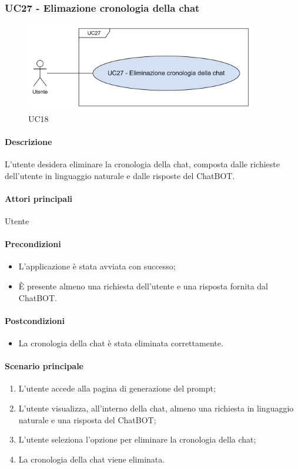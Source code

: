 \subsubsection{UC27 - Elimazione cronologia della chat}\label{UC27}

\begin{figure}[H]
  \centering
  \includegraphics[width=0.90\textwidth]{assets/uc27.png}
  \caption{UC18}
\end{figure}

\paragraph*{Descrizione}
L'utente desidera eliminare la cronologia della chat, composta dalle richieste dell'utente in linguaggio naturale e dalle risposte del ChatBOT.

\paragraph*{Attori principali}
Utente

\paragraph*{Precondizioni}
\begin{itemize}
  \item L'applicazione è stata avviata con successo;
  \item È presente almeno una richiesta dell'utente e una risposta fornita dal ChatBOT.
\end{itemize}

\paragraph*{Postcondizioni}
\begin{itemize}
  \item La cronologia della chat è stata eliminata correttamente.
\end{itemize}

\paragraph*{Scenario principale}
\begin{enumerate}
  \item L'utente accede alla pagina di generazione del prompt;
  \item L'utente visualizza, all'interno della chat, almeno una richiesta in linguaggio naturale e una risposta del ChatBOT;
  \item L'utente seleziona l'opzione per eliminare la cronologia della chat;
  \item La cronologia della chat viene eliminata.
\end{enumerate}
